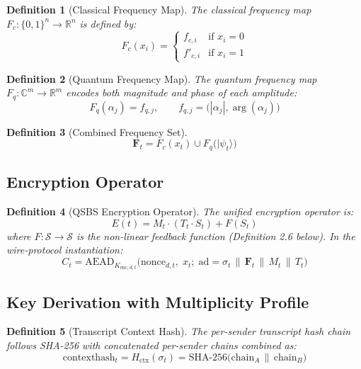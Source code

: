 \documentclass[11pt,letterpaper]{article}
\newtheorem{definition}{Definition}[section]
\begin{document}
\begin{definition}[Classical Frequency Map]
The classical frequency map \(F_c : \{0,1\}^n \to \mathbb{R}^n\) is defined by:
\[
  F_c(x_i) = \begin{cases} f_{c,i} & \text{if } x_i = 0 \\ f'_{c,i} & \text{if } x_i = 1 \end{cases} \tag{6}
\]
\end{definition}

\begin{definition}[Quantum Frequency Map]
The quantum frequency map \(F_q : \mathbb{C}^m \to \mathbb{R}^m\) encodes both
magnitude and phase of each amplitude:
\[
  F_q(\alpha_j) = f_{q,j}, \qquad f_{q,j} = \bigl(|\alpha_j|, \arg(\alpha_j)\bigr) \tag{7}
\]
\end{definition}

\begin{definition}[Combined Frequency Set]
\[
  \mathbf{F}_t = F_c(x_t) \cup F_q\bigl(|\psi_t\rangle\bigr) \tag{8}
\]
\end{definition}

\subsection{Encryption Operator}

\begin{definition}[QSBS Encryption Operator]
The unified encryption operator is:
\[
  E(t) = M_t \cdot (T_t \cdot S_t) + F(S_t) \tag{9}
\]
where \(F : \mathcal{S} \to \mathcal{S}\) is the non-linear feedback function
(Definition 2.6 below). In the wire-protocol instantiation:
\[
  C_t = \text{AEAD}_{K_{\text{enc},d,t}}\!\bigl(\text{nonce}_{d,t},\; x_t;\;
        \text{ad} = \sigma_t \,\|\, \mathbf{F}_t \,\|\, M_t \,\|\, T_t \bigr) \tag{10}
\]
\end{definition}

\subsection{Key Derivation with Multiplicity Profile}

\begin{definition}[Transcript Context Hash]
The per-sender transcript hash chain follows SHA-256 with concatenated per-sender
chains combined as:
\[
  \text{contexthash}_t = H_{\text{ctx}}(\sigma_t) = \text{SHA-256}
    \bigl(\text{chain}_A \,\|\, \text{chain}_B\bigr) \tag{11}
\]
\end{definition}
\end{document}
